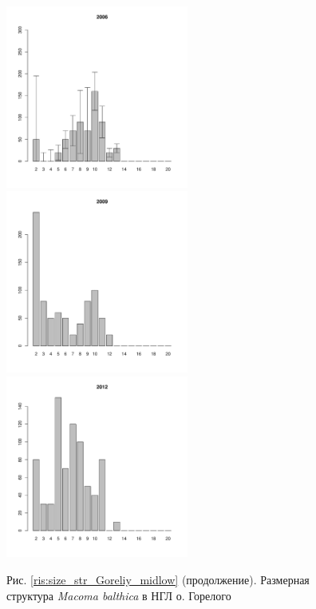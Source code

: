 \begin{figure}[hp]
\begin{minipage}[b]{.3\linewidth}
\begin{center}
	\end{center}
	\end{minipage}
	\begin{minipage}[b]{.3\linewidth}
	\begin{center}
	\includegraphics[width=60mm]{../White_Sea/Luvenga_Goreliy/midlow2_2006_.pdf}
	\end{center}
	\end{minipage}
	\hfill
	\begin{minipage}[b]{.3\linewidth}
	\begin{center}
	\includegraphics[width=60mm]{../White_Sea/Luvenga_Goreliy/midlow2_2009_.pdf}
	\end{center}
	\end{minipage}
	\hfill
	\begin{minipage}[b]{.3\linewidth}
	\begin{center}
	\includegraphics[width=60mm]{../White_Sea/Luvenga_Goreliy/midlow2_2012_.pdf}
	\end{center}
	\end{minipage}
\begin{center}
Рис. \ref{ris:size_str_Goreliy_midlow} (продолжение). Размерная структура {\it Macoma balthica} в НГЛ о. Горелого
\end{center}
\end{figure}




